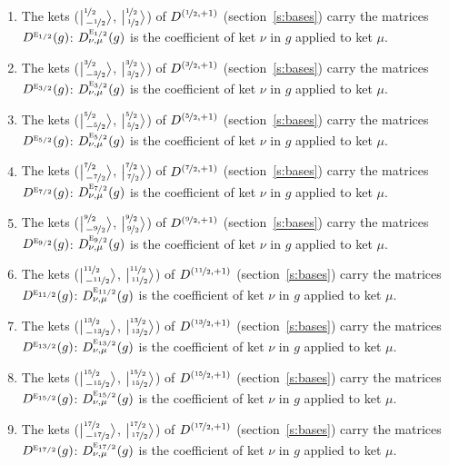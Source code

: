 \documentclass[10pt,a4paper]{article}
\numberwithin{equation}{section}
\newcommand{\irr}[1]{\text{\normalfont\scshape #1}}
\newcommand{\irrJp}[2]{D^{(#1,#2)}}
\newcommand{\repD}[1]{D^{#1}}
\newcommand{\intx}{\mu}
\newcommand{\jm}[2]{\bigl\lvert{}^{#1}_{\,#2}\bigr\rangle}
\newenvironment{romanlist}{\begin{enumerate}%
\renewcommand{\labelenumi}{(\roman{enumi})}}%
  {\end{enumerate}}
\begin{document}
\begin{romanlist}\raggedright
\item The kets ($\jm{\nicefrac{1}{2}}{-\nicefrac{1}{2}}$, $\jm{\nicefrac{1}{2}}{\nicefrac{1}{2}}$) of $\irrJp{\nicefrac{1}{2}}{+1}$ (section~\ref{s:bases}) carry the matrices $\repD{\irr{e}_{1/2}}(g)$: $\repD{\irr{e}_{1/2}}_{\nu,\intx}(g)$ is the coefficient of ket $\nu$ in $g$ applied to ket $\intx$.
\item The kets ($\jm{\nicefrac{3}{2}}{-\nicefrac{3}{2}}$, $\jm{\nicefrac{3}{2}}{\nicefrac{3}{2}}$) of $\irrJp{\nicefrac{3}{2}}{+1}$ (section~\ref{s:bases}) carry the matrices $\repD{\irr{e}_{3/2}}(g)$: $\repD{\irr{e}_{3/2}}_{\nu,\intx}(g)$ is the coefficient of ket $\nu$ in $g$ applied to ket $\intx$.
\item The kets ($\jm{\nicefrac{5}{2}}{-\nicefrac{5}{2}}$, $\jm{\nicefrac{5}{2}}{\nicefrac{5}{2}}$) of $\irrJp{\nicefrac{5}{2}}{+1}$ (section~\ref{s:bases}) carry the matrices $\repD{\irr{e}_{5/2}}(g)$: $\repD{\irr{e}_{5/2}}_{\nu,\intx}(g)$ is the coefficient of ket $\nu$ in $g$ applied to ket $\intx$.
\item The kets ($\jm{\nicefrac{7}{2}}{-\nicefrac{7}{2}}$, $\jm{\nicefrac{7}{2}}{\nicefrac{7}{2}}$) of $\irrJp{\nicefrac{7}{2}}{+1}$ (section~\ref{s:bases}) carry the matrices $\repD{\irr{e}_{7/2}}(g)$: $\repD{\irr{e}_{7/2}}_{\nu,\intx}(g)$ is the coefficient of ket $\nu$ in $g$ applied to ket $\intx$.
\item The kets ($\jm{\nicefrac{9}{2}}{-\nicefrac{9}{2}}$, $\jm{\nicefrac{9}{2}}{\nicefrac{9}{2}}$) of $\irrJp{\nicefrac{9}{2}}{+1}$ (section~\ref{s:bases}) carry the matrices $\repD{\irr{e}_{9/2}}(g)$: $\repD{\irr{e}_{9/2}}_{\nu,\intx}(g)$ is the coefficient of ket $\nu$ in $g$ applied to ket $\intx$.
\item The kets ($\jm{\nicefrac{11}{2}}{-\nicefrac{11}{2}}$, $\jm{\nicefrac{11}{2}}{\nicefrac{11}{2}}$) of $\irrJp{\nicefrac{11}{2}}{+1}$ (section~\ref{s:bases}) carry the matrices $\repD{\irr{e}_{11/2}}(g)$: $\repD{\irr{e}_{11/2}}_{\nu,\intx}(g)$ is the coefficient of ket $\nu$ in $g$ applied to ket $\intx$.
\item The kets ($\jm{\nicefrac{13}{2}}{-\nicefrac{13}{2}}$, $\jm{\nicefrac{13}{2}}{\nicefrac{13}{2}}$) of $\irrJp{\nicefrac{13}{2}}{+1}$ (section~\ref{s:bases}) carry the matrices $\repD{\irr{e}_{13/2}}(g)$: $\repD{\irr{e}_{13/2}}_{\nu,\intx}(g)$ is the coefficient of ket $\nu$ in $g$ applied to ket $\intx$.
\item The kets ($\jm{\nicefrac{15}{2}}{-\nicefrac{15}{2}}$, $\jm{\nicefrac{15}{2}}{\nicefrac{15}{2}}$) of $\irrJp{\nicefrac{15}{2}}{+1}$ (section~\ref{s:bases}) carry the matrices $\repD{\irr{e}_{15/2}}(g)$: $\repD{\irr{e}_{15/2}}_{\nu,\intx}(g)$ is the coefficient of ket $\nu$ in $g$ applied to ket $\intx$.
\item The kets ($\jm{\nicefrac{17}{2}}{-\nicefrac{17}{2}}$, $\jm{\nicefrac{17}{2}}{\nicefrac{17}{2}}$) of $\irrJp{\nicefrac{17}{2}}{+1}$ (section~\ref{s:bases}) carry the matrices $\repD{\irr{e}_{17/2}}(g)$: $\repD{\irr{e}_{17/2}}_{\nu,\intx}(g)$ is the coefficient of ket $\nu$ in $g$ applied to ket $\intx$.
\end{romanlist}
\end{document}
